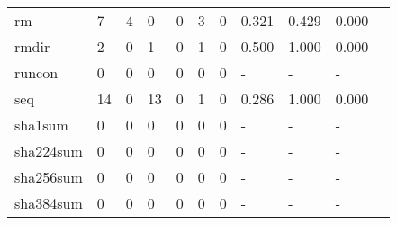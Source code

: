 \begin{longtable}{lp{1.10cm}p{1.10cm}p{1.10cm}p{1.10cm}p{1.10cm}p{1.10cm}p{1.10cm}p{1.10cm}p{1.10cm}p{1.10cm}}
rm        &                      7 &                                  4 &                                 0 &                                0 &                                 3 &                               0 &                          0.321 &                                 0.429 &                               0.000 \\
rmdir     &                      2 &                                  0 &                                 1 &                                0 &                                 1 &                               0 &                          0.500 &                                 1.000 &                               0.000 \\
runcon    &                      0 &                                  0 &                                 0 &                                0 &                                 0 &                               0 &                              - &                                     - &                                   - \\
seq       &                     14 &                                  0 &                                13 &                                0 &                                 1 &                               0 &                          0.286 &                                 1.000 &                               0.000 \\
sha1sum   &                      0 &                                  0 &                                 0 &                                0 &                                 0 &                               0 &                              - &                                     - &                                   - \\
sha224sum &                      0 &                                  0 &                                 0 &                                0 &                                 0 &                               0 &                              - &                                     - &                                   - \\
sha256sum &                      0 &                                  0 &                                 0 &                                0 &                                 0 &                               0 &                              - &                                     - &                                   - \\
sha384sum &                      0 &                                  0 &                                 0 &                                0 &                                 0 &                               0 &                              - &                                     - &                                   - \\

\end{longtable}
